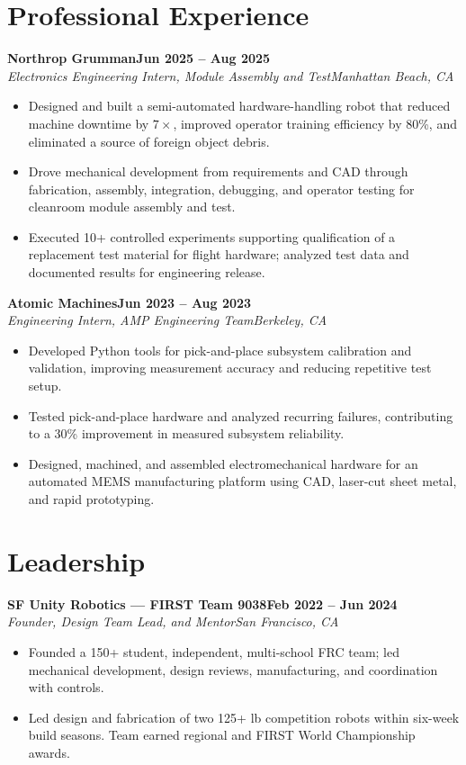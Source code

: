 \documentclass[10pt,letterpaper]{article}
\newcommand{\entry}[4]{%
  \textbf{#1}\hfill\textbf{#2}\\
  \textit{#3}\hfill\textit{#4}\par
}
\begin{document}
\section{Professional Experience}
\entry{Northrop Grumman}{Jun 2025 -- Aug 2025}
{Electronics Engineering Intern, Module Assembly and Test}{Manhattan Beach, CA}
\begin{itemize}
  \item Designed and built a semi-automated hardware-handling robot that reduced machine downtime by $7\times$, improved operator training efficiency by 80\%, and eliminated a source of foreign object debris.
  \item Drove mechanical development from requirements and CAD through fabrication, assembly, integration, debugging, and operator testing for cleanroom module assembly and test.
  \item Executed 10+ controlled experiments supporting qualification of a replacement test material for flight hardware; analyzed test data and documented results for engineering release.
\end{itemize}
\vspace{3pt}
\entry{Atomic Machines}{Jun 2023 -- Aug 2023}
{Engineering Intern, AMP Engineering Team}{Berkeley, CA}
\begin{itemize}
  \item Developed Python tools for pick-and-place subsystem calibration and validation, improving measurement accuracy and reducing repetitive test setup.
  \item Tested pick-and-place hardware and analyzed recurring failures, contributing to a 30\% improvement in measured subsystem reliability.
  \item Designed, machined, and assembled electromechanical hardware for an automated MEMS manufacturing platform using CAD, laser-cut sheet metal, and rapid prototyping.
\end{itemize}

\section{Leadership}
\entry{SF Unity Robotics --- FIRST Team 9038}{Feb 2022 -- Jun 2024}
{Founder, Design Team Lead, and Mentor}{San Francisco, CA}
\begin{itemize}
  \item Founded a 150+ student, independent, multi-school FRC team; led mechanical development, design reviews, manufacturing, and coordination with controls.
  \item Led design and fabrication of two 125+ lb competition robots within six-week build seasons. Team earned regional and FIRST World Championship awards.
\end{itemize}
\end{document}
